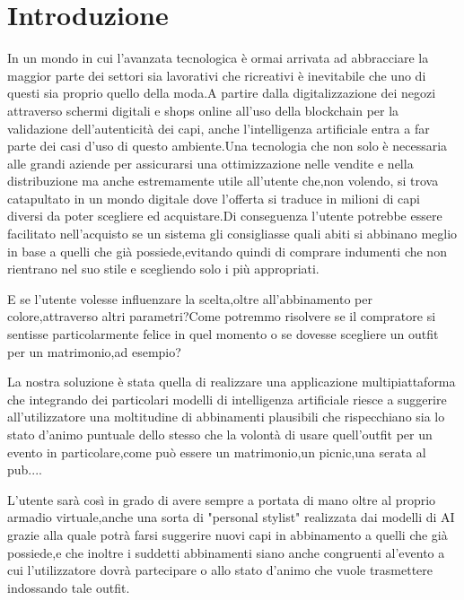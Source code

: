 \chapter{Introduzione}\label{ch:introduzione}

In un mondo in cui l'avanzata tecnologica è ormai arrivata ad abbracciare la maggior parte dei settori sia lavorativi che ricreativi è inevitabile che uno di questi sia proprio quello della moda.A partire dalla digitalizzazione dei negozi attraverso schermi digitali e shops online all'uso della blockchain per la validazione dell'autenticità dei capi, anche l'intelligenza artificiale entra a far parte dei casi d'uso di questo ambiente.Una tecnologia che non solo è necessaria alle grandi aziende per assicurarsi una ottimizzazione nelle vendite e nella distribuzione ma anche estremamente utile all'utente che,non volendo, si trova catapultato in un mondo digitale dove l'offerta si traduce in milioni di capi diversi da poter scegliere ed acquistare.Di conseguenza l'utente potrebbe essere facilitato nell'acquisto se un sistema gli consigliasse quali abiti si abbinano meglio in base a quelli che già possiede,evitando quindi di comprare indumenti che non rientrano nel suo stile e scegliendo solo i più appropriati.

E se l'utente volesse influenzare la scelta,oltre all'abbinamento per colore,attraverso altri parametri?Come potremmo risolvere se il compratore si sentisse particolarmente felice in quel momento o se dovesse scegliere un outfit per un matrimonio,ad esempio?

La nostra soluzione è stata quella di realizzare una applicazione multipiattaforma che integrando dei particolari modelli di intelligenza artificiale riesce a suggerire all'utilizzatore una moltitudine di abbinamenti plausibili che rispecchiano sia lo stato d'animo puntuale dello stesso che la volontà di usare quell'outfit per un evento in particolare,come può essere un matrimonio,un picnic,una serata al pub....

L'utente sarà così in grado di avere sempre a portata di mano oltre al proprio armadio virtuale,anche una sorta di "personal stylist" realizzata dai modelli di AI grazie alla quale potrà farsi suggerire nuovi capi in abbinamento a quelli che già possiede,e che inoltre i suddetti abbinamenti siano anche congruenti al'evento a cui l'utilizzatore dovrà partecipare o allo stato d'animo che vuole trasmettere indossando tale outfit.
